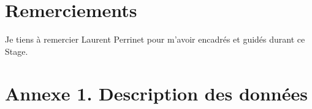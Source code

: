 \documentclass[11pt]{article}
\begin{document}

\section*{Remerciements}
Je tiens à remercier Laurent Perrinet pour m'avoir encadrés et guidés durant ce Stage.



\newpage
\section*{Annexe 1. Description des données}

\end{document}
